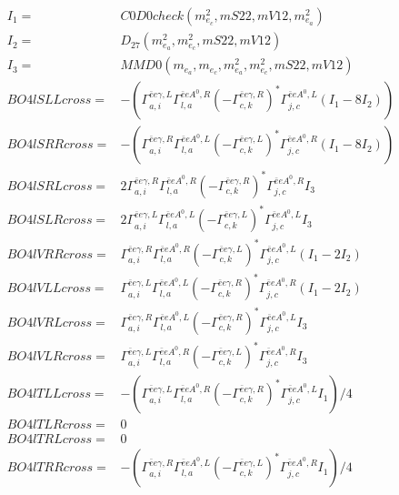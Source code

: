 \documentclass[A4,landscape]{article}
\begin{document}
\begin{align} 
I_1 = & C0D0check(m^2_{e_{{c}}}, mS22, mV12, m^2_{e_{{a}}}) \\ 
I_2 = & D_{27}(m^2_{e_{{a}}}, m^2_{e_{{c}}}, mS22, mV12) \\ 
I_3 = & MMD0(m_{e_{{a}}}, m_{e_{{c}}}, m^2_{e_{{a}}}, m^2_{e_{{c}}}, mS22, mV12) \\ 
  BO4lSLLcross= & -( \Gamma^{\bar{e}e \gamma ,L}_{a, i} \Gamma^{\bar{e}e A^0 ,R}_{l, a} (- \Gamma^{\bar{e}e \gamma ,R} _{c, k})^* \Gamma^{\bar{e}e A^0 ,L}_{j, c} (I_1 - 8 I_2)) \\ 
  BO4lSRRcross= & -( \Gamma^{\bar{e}e \gamma ,R}_{a, i} \Gamma^{\bar{e}e A^0 ,L}_{l, a} (- \Gamma^{\bar{e}e \gamma ,L} _{c, k})^* \Gamma^{\bar{e}e A^0 ,R}_{j, c} (I_1 - 8 I_2)) \\ 
  BO4lSRLcross= & 2  \Gamma^{\bar{e}e \gamma ,R}_{a, i} \Gamma^{\bar{e}e A^0 ,R}_{l, a} (- \Gamma^{\bar{e}e \gamma ,R} _{c, k})^* \Gamma^{\bar{e}e A^0 ,R}_{j, c} I_3 \\ 
  BO4lSLRcross= & 2  \Gamma^{\bar{e}e \gamma ,L}_{a, i} \Gamma^{\bar{e}e A^0 ,L}_{l, a} (- \Gamma^{\bar{e}e \gamma ,L} _{c, k})^* \Gamma^{\bar{e}e A^0 ,L}_{j, c} I_3 \\ 
  BO4lVRRcross= &  \Gamma^{\bar{e}e \gamma ,R}_{a, i} \Gamma^{\bar{e}e A^0 ,R}_{l, a} (- \Gamma^{\bar{e}e \gamma ,L} _{c, k})^* \Gamma^{\bar{e}e A^0 ,L}_{j, c} (I_1 - 2 I_2) \\ 
  BO4lVLLcross= &  \Gamma^{\bar{e}e \gamma ,L}_{a, i} \Gamma^{\bar{e}e A^0 ,L}_{l, a} (- \Gamma^{\bar{e}e \gamma ,R} _{c, k})^* \Gamma^{\bar{e}e A^0 ,R}_{j, c} (I_1 - 2 I_2) \\ 
  BO4lVRLcross= &  \Gamma^{\bar{e}e \gamma ,R}_{a, i} \Gamma^{\bar{e}e A^0 ,L}_{l, a} (- \Gamma^{\bar{e}e \gamma ,R} _{c, k})^* \Gamma^{\bar{e}e A^0 ,L}_{j, c} I_3 \\ 
  BO4lVLRcross= &  \Gamma^{\bar{e}e \gamma ,L}_{a, i} \Gamma^{\bar{e}e A^0 ,R}_{l, a} (- \Gamma^{\bar{e}e \gamma ,L} _{c, k})^* \Gamma^{\bar{e}e A^0 ,R}_{j, c} I_3 \\ 
  BO4lTLLcross= & -( \Gamma^{\bar{e}e \gamma ,L}_{a, i} \Gamma^{\bar{e}e A^0 ,R}_{l, a} (- \Gamma^{\bar{e}e \gamma ,R} _{c, k})^* \Gamma^{\bar{e}e A^0 ,L}_{j, c} I_1)/4 \\ 
  BO4lTLRcross= & 0 \\ 
  BO4lTRLcross= & 0 \\ 
  BO4lTRRcross= & -( \Gamma^{\bar{e}e \gamma ,R}_{a, i} \Gamma^{\bar{e}e A^0 ,L}_{l, a} (- \Gamma^{\bar{e}e \gamma ,L} _{c, k})^* \Gamma^{\bar{e}e A^0 ,R}_{j, c} I_1)/4 \\ 
\end{align} 
\end{document}
